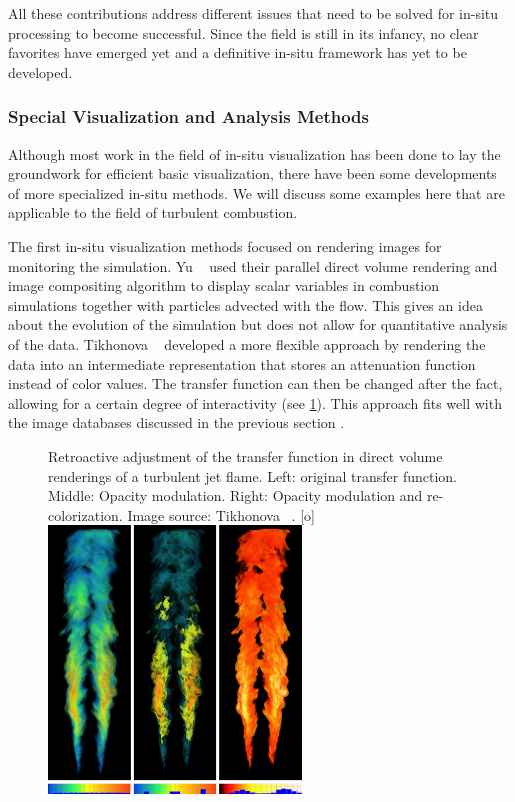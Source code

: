 %
All these contributions address different issues that need to be solved for
in-situ processing to become successful.
%
Since the field is still in its infancy, no clear favorites have emerged yet and
a definitive in-situ framework has yet to be developed.
%
%
\subsubsection{Special Visualization and Analysis Methods} %
\label{ssub:visualization_and_analysis_methods}
%
Although most work in the field of in-situ visualization has been done to lay
the groundwork for efficient basic visualization, there have been some
developments of more specialized in-situ methods.
%
We will discuss some examples here that are applicable to the field of turbulent
combustion.
%

%
The first in-situ visualization methods focused on rendering images for
monitoring the simulation.
%
Yu \etal{}~\cite{Yu2010} used their parallel direct volume rendering and image
compositing algorithm \cite{Yu2008} to display scalar variables in combustion
simulations together with particles advected with the flow.
%
This gives an idea about the evolution of the simulation but does not allow for
quantitative analysis of the data.
%
Tikhonova \etal{}~\cite{Tikhonova2011} developed a more flexible approach by
rendering the data into an intermediate representation that stores an
attenuation function instead of color values.
%
The transfer function can then be changed after the fact, allowing for a certain
degree of interactivity (see \cref{fig:tikhonova_tf}).
%
This approach fits well with the image databases discussed in the previous
section \cite{Kageyama2014,Ahrens2014}.
%
\begin{figure}[t]
    \begin{captionbeside}{
        Retroactive adjustment of the transfer function in direct volume
        renderings of a turbulent jet flame. Left: original transfer function.
        Middle: Opacity modulation. Right: Opacity modulation and
        re-colorization. Image source: Tikhonova \etal{}~\cite{Tikhonova2011}.
        \label{fig:tikhonova_tf}
    }[o]
        \includegraphics[width=0.6\textwidth]{figures/tikhonova_transfer_function.png}
    \end{captionbeside}
\end{figure}
%

